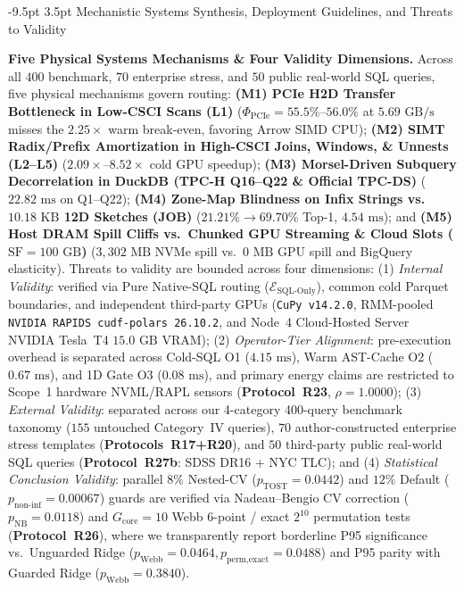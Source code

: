 \documentclass[10pt,a4paper]{article}
\makeatletter
\renewcommand\section{\@startsection{section}{1}{\z@}%
  {-9.5pt \@plus -2pt \@minus -1.5pt}%
  {3.5pt \@plus 1pt}%
  {\normalfont\large\bfseries}}
\makeatother
\begin{document}
\section{Mechanistic Systems Synthesis, Deployment Guidelines, and Threats to Validity}
\par\noindent\textbf{Five Physical Systems Mechanisms \& Four Validity Dimensions.} Across all $400$ benchmark, $70$ enterprise stress, and $50$ public real-world SQL queries, five physical mechanisms govern routing: \textbf{(M1) PCIe H2D Transfer Bottleneck in Low-CSCI Scans (L1)} ($\Phi_{\text{PCIe}}=55.5\%\text{--}56.0\%$ at $5.69\text{ GB/s}$ misses the $2.25\times$ warm break-even, favoring Arrow SIMD CPU); \textbf{(M2) SIMT Radix/Prefix Amortization in High-CSCI Joins, Windows, \& Unnests (L2--L5)} ($2.09\times\text{--}8.52\times$ cold GPU speedup); \textbf{(M3) Morsel-Driven Subquery Decorrelation in DuckDB (TPC-H Q16--Q22 \& Official TPC-DS)} ($22.82\text{ ms}$ on Q1--Q22); \textbf{(M4) Zone-Map Blindness on Infix Strings vs.\ $10.18\text{ KB}$ 12D Sketches (JOB)} ($21.21\%\rightarrow 69.70\%$ Top-1, $4.54\text{ ms}$); and \textbf{(M5) Host DRAM Spill Cliffs vs.\ Chunked GPU Streaming \& Cloud Slots ($\text{SF}=100\text{ GB}$)} ($3{,}302\text{ MB}$ NVMe spill vs.\ $0\text{ MB}$ GPU spill and BigQuery elasticity). Threats to validity are bounded across four dimensions: (1) \emph{Internal Validity}: verified via Pure Native-SQL routing ($\mathcal{E}_{\text{SQL-Only}}$), common cold Parquet boundaries, and independent third-party GPUs (\texttt{CuPy v14.2.0}, RMM-pooled \texttt{NVIDIA RAPIDS cudf-polars 26.10.2}, and Node~4 Cloud-Hosted Server NVIDIA Tesla~T4 $15.0\text{ GB}$ VRAM); (2) \emph{Operator-Tier Alignment}: pre-execution overhead is separated across Cold-SQL O1 ($4.15\text{ ms}$), Warm AST-Cache O2 ($0.67\text{ ms}$), and 1D Gate O3 ($0.08\text{ ms}$), and primary energy claims are restricted to Scope~1 hardware NVML/RAPL sensors (\textbf{Protocol~R23}, $\rho=1.0000$); (3) \emph{External Validity}: separated across our 4-category 400-query benchmark taxonomy ($155$ untouched Category~IV queries), $70$ author-constructed enterprise stress templates (\textbf{Protocols~R17+R20}), and $50$ third-party public real-world SQL queries (\textbf{Protocol~R27b}: SDSS DR16 + NYC TLC); and (4) \emph{Statistical Conclusion Validity}: parallel $8\%$ Nested-CV ($p_{\text{TOST}}=0.0442$) and $12\%$ Default ($p_{\text{non-inf}}=0.00067$) guards are verified via Nadeau--Bengio CV correction ($p_{\text{NB}}=0.0118$) and $G_{\text{core}}=10$ Webb 6-point / exact $2^{10}$ permutation tests (\textbf{Protocol~R26}), where we transparently report borderline P95 significance vs.\ Unguarded Ridge ($p_{\text{Webb}}=0.0464, p_{\text{perm,exact}}=0.0488$) and P95 parity with Guarded Ridge ($p_{\text{Webb}}=0.3840$).
\end{document}
